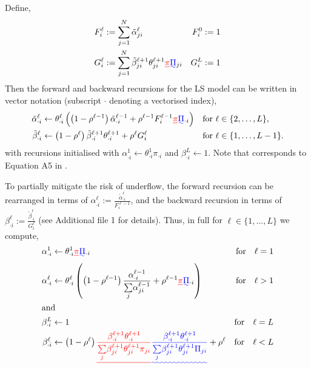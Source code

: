 \documentclass[pdflatex,referee,lineno,sn-nature]{sn-jnl}%
\providecommand{\DIFadd}[1]{{\protect\color{blue}\uwave{#1}}} %
\providecommand{\DIFdel}[1]{{\protect\color{red}\sout{#1}}}                      %
\providecommand{\DIFaddbegin}{} %
\providecommand{\DIFaddend}{} %
\providecommand{\DIFdelbegin}{} %
\providecommand{\DIFdelend}{} %
\newcommand{\DIFscaledelfig}{0.5}
\newlength{\DIFdelgraphicswidth} %
\newlength{\DIFdelgraphicsheight} %
\newcommand{\DIFaddincludegraphics}[2][]{{\color{blue}\fbox{\DIFOincludegraphics[#1]{#2}}}} %
\newcommand{\DIFdelincludegraphics}[2][]{%
\sbox{\DIFdelgraphicsbox}{\DIFOincludegraphics[#1]{#2}}%
\settoboxwidth{\DIFdelgraphicswidth}{\DIFdelgraphicsbox} %
\settoboxtotalheight{\DIFdelgraphicsheight}{\DIFdelgraphicsbox} %
\scalebox{\DIFscaledelfig}{%
\parbox[b]{\DIFdelgraphicswidth}{\usebox{\DIFdelgraphicsbox}\\[-\baselineskip] \rule{\DIFdelgraphicswidth}{0em}}\llap{\resizebox{\DIFdelgraphicswidth}{\DIFdelgraphicsheight}{%
\setlength{\unitlength}{\DIFdelgraphicswidth}%
\begin{picture}(1,1)%
\thicklines\linethickness{2pt} %
{\color[rgb]{1,0,0}\put(0,0){\framebox(1,1){}}}%
{\color[rgb]{1,0,0}\put(0,0){\line( 1,1){1}}}%
{\color[rgb]{1,0,0}\put(0,1){\line(1,-1){1}}}%
\end{picture}%
}\hspace*{3pt}}} %
} %
\DeclareRobustCommand{\DIFaddbegin}{\DIFOaddbegin \let\includegraphics\DIFaddincludegraphics} %
\DeclareRobustCommand{\DIFaddend}{\DIFOaddend \let\includegraphics\DIFOincludegraphics} %
\DeclareRobustCommand{\DIFdelbegin}{\DIFOdelbegin \let\includegraphics\DIFdelincludegraphics} %
\DeclareRobustCommand{\DIFdelend}{\DIFOaddend \let\includegraphics\DIFOincludegraphics} %
\begin{document}
Define,
\begin{align}
	F_i^\ell &:= \sum_{j=1}^N \tilde{\alpha}_{ji}^{\ell} & F_i^{0} &:= 1 \label{eq:F} \\
	G_i^\ell &:= \sum_{j=1}^N \tilde{\beta}_{ji}^{\ell+1}\theta_{ji}^{\ell+1} \DIFdelbegin \DIFdel{\pi}\DIFdelend \DIFaddbegin \DIFadd{\Pi}\DIFaddend _{ji} & G_i^L &:= 1 \label{eq:G}
\end{align}
Then the forward and backward recursions for the LS model can be written in vector notation (subscript \(\cdot\) denoting a vectorised index),
\begin{align}
	\tilde{\alpha}_{\cdot i}^{\ell} &\gets \theta^{\ell}_{\cdot i} \left( \left(1-\rho^{\ell-1}\right) \tilde{\alpha}_{\cdot i}^{\ell-1} + \rho^{\ell-1} F_i^{\ell-1} \DIFdelbegin \DIFdel{\pi}\DIFdelend \DIFaddbegin \DIFadd{\Pi}\DIFaddend _{\cdot i} \right) & \text{for } \ell &\in \{2,\dots,L\}, \label{eq:raw_forward} \\
	\tilde{\beta}_{\cdot i}^{\ell} &\gets \left( 1- \rho^{\ell}\right) \tilde{\beta}_{\cdot i}^{\ell+1} \theta^{\ell+1}_{\cdot i} + \rho^{\ell} G_i^\ell & \text{for } \ell &\in \{1,\dots,L-1\} \label{eq:raw_backward}.
\end{align}
with recursions initialised with \DIFdelbegin \DIFdel{\(\alpha_{\cdot i}^{1} \gets \theta^{1}_{\cdot i} \pi_{\cdot i}\) }\DIFdelend \DIFaddbegin \DIFadd{\(\alpha_{\cdot i}^{1} \gets \theta^{1}_{\cdot i} \Pi_{\cdot i}\) }\DIFaddend and \(\beta_{\cdot i}^{L} \gets 1\).
Note that  corresponds to Equation A5 in \cite{Li2213}.

To partially mitigate the risk of underflow, the forward recursion can be rearranged in terms of \(\alpha_{\cdot i}^{\ell} := \frac{\tilde{\alpha}_{\cdot i}^{\ell}}{ F_i^{\ell-1}}\), and the backward recursion in terms of \(\beta_{\cdot i}^{\ell} := \frac{\tilde{\beta}_{\cdot i}^{\ell}}{G_i^{\ell}}\) (see Additional file 1 for details).
Thus, in full for \(\ell \in \{1,\dots,L\}\) we compute,
\begin{align}
	\alpha_{\cdot i}^{1} &\gets \theta^{1}_{\cdot i} \DIFdelbegin \DIFdel{\pi}\DIFdelend \DIFaddbegin \DIFadd{\Pi}\DIFaddend _{\cdot i} &\textrm{for} \quad \ell = 1 \label{eq:fwd0} \\
	\alpha_{\cdot i}^{\ell} &\gets \theta^{\ell}_{\cdot i} \left( \left(1-\rho^{\ell-1}\right) \frac{\alpha_{\cdot i}^{\ell-1}}{\underset{j}{\sum} \alpha_{ji}^{\ell-1}} + \rho^{\ell-1} \DIFdelbegin \DIFdel{\pi}\DIFdelend \DIFaddbegin \DIFadd{\Pi}\DIFaddend _{\cdot i} \right) &\textrm{for} \quad \ell > 1 \label{eq:fwd1} \\ \intertext{and}
	\beta_{\cdot i}^{L} &\gets 1 &\textrm{for} \quad \ell = L \label{eq:bck0} \\
	\beta_{\cdot i}^{\ell} &\gets \left( 1- \rho^{\ell}\right) \DIFdelbegin \DIFdel{\frac{\beta_{\cdot i}^{\ell+1} \theta^{\ell+1}_{\cdot i}}{\underset{j}{\sum} \beta_{ji}^{\ell+1}\theta_{ji}^{\ell+1} \pi_{ji}} }\DIFdelend \DIFaddbegin \DIFadd{\frac{\beta_{\cdot i}^{\ell+1} \theta^{\ell+1}_{\cdot i}}{\underset{j}{\sum} \beta_{ji}^{\ell+1}\theta_{ji}^{\ell+1} \Pi_{ji}} }\DIFaddend + \rho^\ell &\textrm{for} \quad \ell < L \label{eq:bck1}
\end{align}
\end{document}

